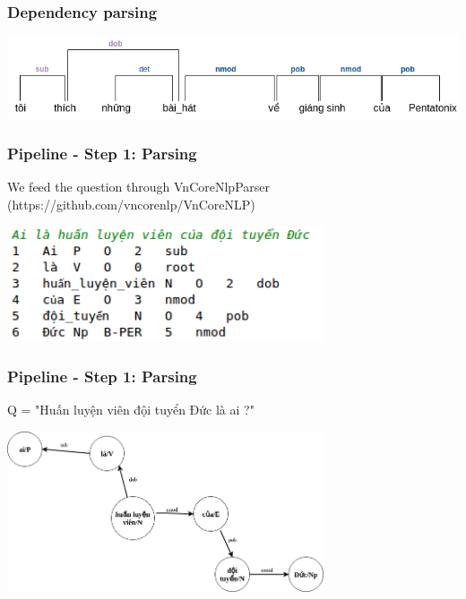 \documentclass{beamer}
\begin{document}
\begin{frame}
	\frametitle{Dependency parsing}
			
	\begin{center} 
		\centering 
			\includegraphics[width=\textwidth,height=\textheight,keepaspectratio]{qa_first_ex} 			
			\vspace{0.5cm} 
	\end{center}		
		
\end{frame}

\begin{frame}
	\frametitle{Pipeline - Step 1: Parsing}
	
	We feed the question through VnCoreNlpParser (https://github.com/vncorenlp/VnCoreNLP)
	
	\begin{center} 
		\centering 
			\includegraphics[width=0.7\textwidth,height=0.7\textheight,keepaspectratio]{firstex} 		
			\vspace{0.5cm} 
	\end{center}	
		
\end{frame}

\begin{frame}
	\frametitle{Pipeline - Step 1: Parsing}
	
	Q = "Huấn luyện viên đội tuyển Đức là ai ?"
	
	\begin{center} 
		\centering 
			\includegraphics[width=0.7\textwidth,height=0.7\textheight,keepaspectratio]{firstextree}
			\vspace{0.5cm} 
	\end{center}
		
\end{frame}
\end{document}
